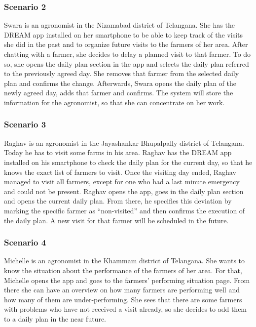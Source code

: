 \subsubsection*{Scenario 2}
Swara is an agronomist in the Nizamabad district of Telangana. She has the DREAM app installed on her smartphone to be able to keep track of the visits she did in the past and to organize future visits to the farmers of her area. After chatting with a farmer, she decides to delay a planned visit to that farmer. To do so, she opens the daily plan section in the app and selects the daily plan referred to the previously agreed day. She removes that farmer from the selected daily plan and confirms the change. Afterwards, Swara opens the daily plan of the newly agreed day, adds that farmer and confirms. The system will store the information for the agronomist, so that she can concentrate on her work.



\subsubsection*{Scenario 3}
Raghav is an agronomist in the Jayashankar Bhupalpally district of Telangana. Today he has to visit some farms in his area. Raghav has the DREAM app installed on his smartphone to check the daily plan for the current day, so that he knows the exact list of farmers to visit. Once the visiting day ended, Raghav managed to visit all farmers, except for one who had a last minute emergency and could not be present. Raghav opens the app, goes in the daily plan section and opens the current daily plan. From there, he specifies this deviation by marking the specific farmer as “non-visited” and then confirms the execution of the daily plan. A new visit for that farmer will be scheduled in the future.

\subsubsection*{Scenario 4}
Michelle is an agronomist in the Khammam district of Telangana. She wants to know the situation about the performance of the farmers of her area. For that, Michelle opens the app and goes to the farmers’ performing situation page. From there she can have an overview on how many farmers are performing well and how many of them are under-performing. She sees that there are some farmers with problems who have not received a visit already, so she decides to add them to a daily plan in the near future.

